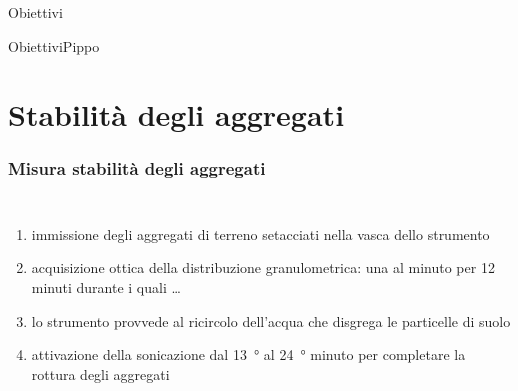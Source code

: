 \documentclass[10pt]{beamer}
\begin{document}
\begin{frame}{Obiettivi}
\begin{frame}{Obiettivi}{Pippo}
\section{Stabilit\`a degli aggregati}
\begin{frame}
  \frametitle{Misura stabilit\`a degli aggregati}
  \begin{columns}
    \pause
    \begin{enumerate}[<+->] 
    \item immissione degli aggregati di terreno setacciati nella vasca
      dello strumento
    \item acquisizione ottica della distribuzione granulometrica:
      una al minuto per 12 minuti durante i quali \ldots
    \item lo strumento provvede al ricircolo dell'acqua che disgrega
      le particelle di suolo
    \item attivazione della sonicazione dal \SI{13}{\degree} al
      \SI{24}{\degree} minuto per completare la rottura degli
      aggregati
    \end{enumerate}


\end{columns}
\end{frame}
\end{frame}
\end{frame}
\end{document}
